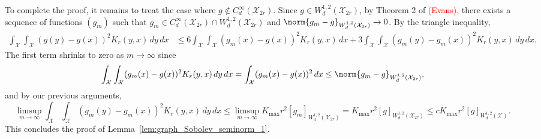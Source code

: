 \documentclass{article}
\newcommand{\1}{\mathbf{1}}
\newcommand{\Xset}{\mathcal{X}}
\theoremstyle{alden}
\theoremstyle{aldenthm}
\theoremstyle{definition}
\theoremstyle{remark}
\begin{document}
To complete the proof, it remains to treat the case where $g \not\in C_d^{\infty}(\Xset_{2r})$. Since $g \in W_d^{1,2}(\Xset_{2r})$, by Theorem 2 of \textcolor{red}{(Evans)}, there exists a sequence of functions $(g_m)$ such that $g_m \in C_d^{\infty}(\Xset_{2r}) \cap W_d^{1,2}(\Xset_{2r})$ and $\norm{g_m - g}_{W_d^{1,2}(\Xset_{2r})} \to 0$. By the triangle inequality,
\begin{align*}
\int_{\Xset} \int_{\Xset} (g(y) - g(x))^2 K_r(y,x) \,dy \,dx & \leq 6 \int_{\Xset} \int_{\Xset} (g_m(x) - g(x))^2 K_r(y,x) \,dx + 3 \int_{\Xset} \int_{\Xset} (g_m(y) - g_m(x))^2 K_r(y,x) \,dy \,dx.
\end{align*}
The first term shrinks to zero as $m \to \infty$ since
\begin{equation*}
\int_{\Xset} \int_{\Xset} (g_m(x) - g(x))^2 K_r(y,x) \,dy \,dx = \int_{\Xset} (g_m(x) - g(x))^2 \,dx \leq \norm{g_m - g}_{W_d^{1,2}(\Xset_{2r})},
\end{equation*}
and by our previous arguments, 
\begin{equation*}
\limsup_{m \to \infty} \int_{\Xset} \int_{\Xset} (g_m(y) - g_m(x))^2 K_r(y,x) \,dy \,dx \leq \limsup_{m \to \infty} K_{\max}r^2[g_m]_{W_d^{1,2}(\Xset_{2r})} = K_{\max}r^2[g]_{W_d^{1,2}(\Xset_{2r})} \leq c K_{\max}r^2[g]_{W_d^{1,2}(\Xset)}.
\end{equation*}
This concludes the proof of Lemma~\ref{lem:graph_Sobolev_seminorm_1}.
\end{document}
